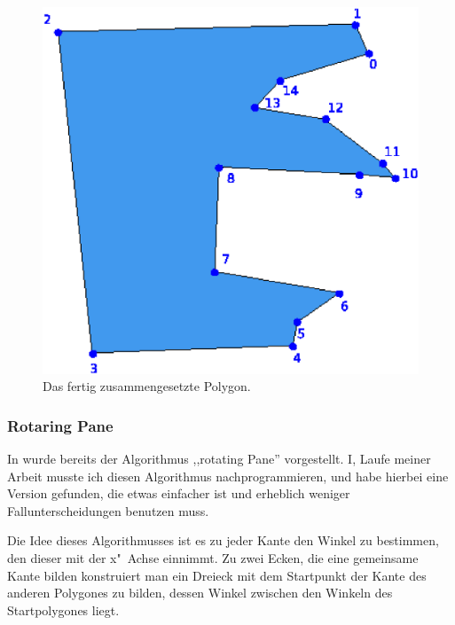 \begin{figure}
	\centering
	\includegraphics[scale=0.6]{JLL3.svg.eps}
	\caption{Das fertig zusammengesetzte Polygon.}
	\label{fig:JLL3}
\end{figure}



\subsubsection{Rotaring Pane} \label{rotPane}
In \cite{TG} wurde bereits der Algorithmus ,,rotating Pane'' vorgestellt. I, Laufe meiner Arbeit musste ich diesen Algorithmus nachprogrammieren, und habe hierbei eine Version gefunden, die etwas einfacher ist und erheblich weniger Fallunterscheidungen benutzen muss.

Die Idee dieses Algorithmusses ist es zu jeder Kante den Winkel zu bestimmen, den dieser mit der x"~Achse einnimmt. Zu zwei Ecken, die eine gemeinsame Kante bilden konstruiert man ein Dreieck mit dem Startpunkt der Kante des anderen Polygones zu bilden, dessen Winkel zwischen den Winkeln des Startpolygones liegt.

